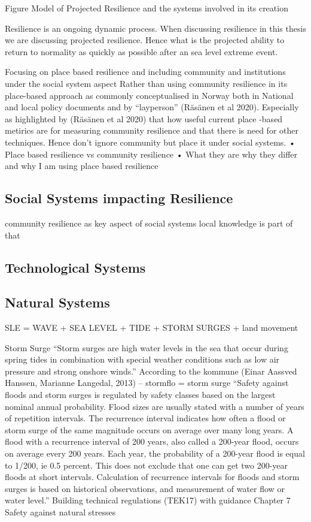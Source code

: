 \documentclass{article}
\begin{document}
\begin{frame}{Figure Model of Projected Resilience and the systems involved in its creation }
\end{frame}

Resilience is an ongoing dynamic process. When discussing resilience in this thesis we are discussing projected resilience. Hence what is the projected ability to return to normality as quickly as possible after an sea level extreme event. 
 
Focusing on place based resilience and including community and institutions under the social system aspect
Rather than using community resilience in its place-based approach as commonly conceptualised in Norway both in National and local policy documents and by “layperson” (Räsänen et al 2020). Especially as highlighted by (Räsänen et al 2020) that how useful current place -based metirics are for measuring community resilience and that there is need for other techniques. Hence don’t ignore community but place it under social systems. 
•	Place based resilience vs community resilience
•	What they are why they differ and why I am using place based resilience


\subsection{Social Systems impacting Resilience}
community resilience as key aspect of social systems
local knowledge is part of that

\subsection{Technological Systems}

\subsection{Natural Systems }
SLE = WAVE + SEA LEVEL + TIDE + STORM SURGES + land movement

Storm Surge
“Storm surges are high water levels in the sea that occur during spring tides in combination with special weather conditions such as low air pressure and strong onshore winds.” According to the kommune (Einar Aassved Hanssen, Marianne Langedal, 2013) – stormflo = storm surge
“Safety against floods and storm surges is regulated by safety classes based on the
largest nominal annual probability. Flood sizes are usually stated with a number of
years of repetition intervals. The recurrence interval indicates how often a flood or
storm surge of the same magnitude occurs on average over many long years. A flood
with a recurrence interval of 200 years, also called a 200-year flood, occurs on average
every 200 years. Each year, the probability of a 200-year flood is equal to 1/200, ie 0.5 percent.
This does not exclude that one can get two 200-year floods at short intervals.
Calculation of recurrence intervals for floods and storm surges is based on historical
observations, and measurement of water flow or water level.”
Building technical regulations (TEK17) with guidance Chapter 7 Safety against natural stresses
\end{document}
